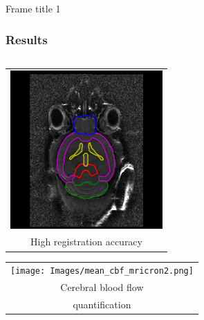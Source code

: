 \documentclass{beamer}
\begin{document}
\begin{frame}{Frame title 1}
\frametitle{Results}
  \begin{center} 
    \begin{columns}
	\hspace*{1cm}

      \begin{column}{0.45\textwidth}

        \begin{tabular}{c} 
	   \includegraphics[width=0.6\linewidth]{Images/atlas_overlays_dim-1pt6.png}\\
		{High registration accuracy}
        \end{tabular}   
        \hspace*{.4cm}
        \begin{tabular}{c} 
	   \texttt{[image: Images/mean\_cbf\_mricron2.png]}\\
		{Cerebral blood flow}\\
		{quantification}
        \end{tabular}   
      \end{column}


\end{columns}
\end{center}
\end{frame}
\end{document}
